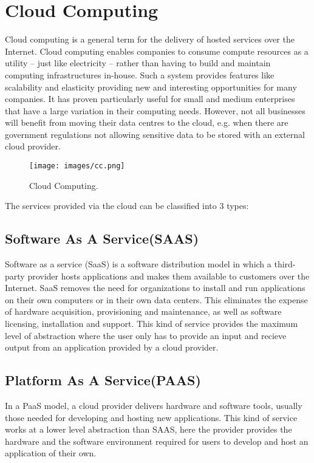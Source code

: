\section{Cloud Computing}
Cloud computing is a general term for the delivery of hosted services over
the Internet.
Cloud computing enables companies to consume compute resources as a
utility – just like electricity – rather than having to build and maintain
computing infrastructures in-house. Such a system provides features like scalability and elasticity providing new and interesting opportunities for many
companies. It has proven particularly useful for small and
medium enterprises that have a large variation in their
computing needs. However, not all businesses will
benefit from moving their data centres to the cloud, e.g.
when there are government regulations not allowing sensitive data to be stored with an external cloud provider.
\begin{figure}
\centering
\texttt{[image: images/cc.png]}
\caption{\label{fig:cc}Cloud Computing.}
\end{figure} 

The services provided via the cloud can be classified into 3 types:
\subsection{Software As A Service(SAAS)}
Software as a service (SaaS) is a software distribution model in which a third-party provider hosts applications and makes them available to customers over the Internet. SaaS removes the need for organizations to install and run applications on their own computers or in their own data centers. This eliminates the expense of hardware acquisition, provisioning and maintenance, as well as software licensing, installation and support. This kind of service provides the maximum level of abstraction where the user only has to provide an input and recieve output from an application provided by a cloud provider.

\subsection{Platform As A Service(PAAS)}
In a PaaS model, a cloud provider delivers hardware and software tools, usually those needed for developing and hosting new applications. This kind of service works at a lower level abstraction than SAAS, here the provider provides the hardware and the software environment required for users to develop and host an application of their own.

